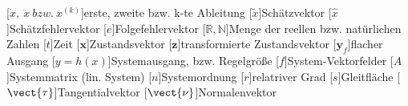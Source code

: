 \begin{acronym}[LabVIEW] %
	[\ensuremath{\dot{x},\ \ddot{x}\ bzw.\ x^{(k)}}]{erste, zweite bzw. k-te Ableitung}
	[\ensuremath{\tilde{x}}]{Schätzvektor}
	[\ensuremath{\hat{x}}]{Schätzfehlervektor}
	[\ensuremath{e}]{Folgefehlervektor}
	[\ensuremath{\mathbb{R},\mathbb{N}}]{Menge der reellen bzw. natürlichen Zahlen}
	[\ensuremath{t}]{Zeit}
	[\ensuremath{\mathbold{x}}]{Zustandsvektor}
	[\ensuremath{\mathbold{z}}]{transformierte Zustandsvektor}
	[\ensuremath{\mathbold{y}_f}]{flacher Ausgang}
	[\ensuremath{y = h(x)}]{Systemausgang, bzw. Regelgröße}
	[\ensuremath{f}]{System-Vektorfelder}
	[\ensuremath{A}]{Systemmatrix (lin. System)}
	[\ensuremath{n}]{Systemordnung}
	[\ensuremath{r}]{relatriver Grad}
	[\ensuremath{s}]{Gleitfläche}
	[\ensuremath{\vect{\tau}}]{Tangentialvektor}
	[\ensuremath{\vect{\nu}}]{Normalenvektor}
\end{acronym}
